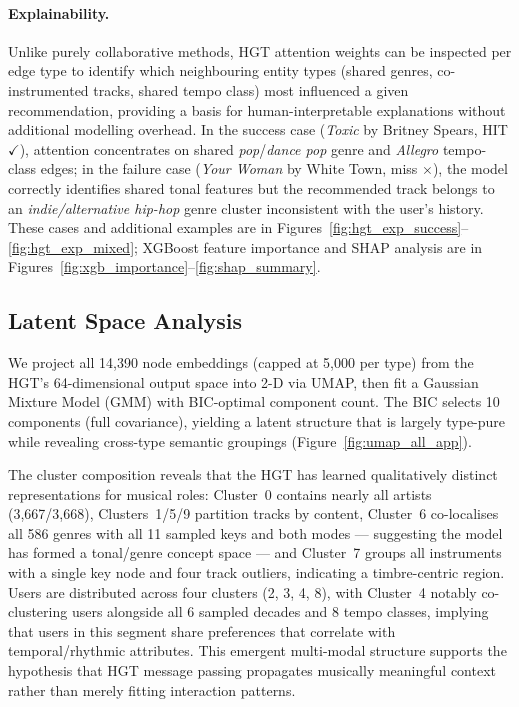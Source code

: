 \paragraph{Explainability.} Unlike purely collaborative methods, HGT attention weights can be inspected per edge type to identify which neighbouring entity types (shared genres, co-instrumented tracks, shared tempo class) most influenced a given recommendation, providing a basis for human-interpretable explanations without additional modelling overhead. In the success case (\textit{Toxic} by Britney Spears, HIT $\checkmark$), attention concentrates on shared \textit{pop}/\textit{dance pop} genre and \textit{Allegro} tempo-class edges; in the failure case (\textit{Your Woman} by White Town, miss $\times$), the model correctly identifies shared tonal features but the recommended track belongs to an \textit{indie/alternative hip-hop} genre cluster inconsistent with the user's history. These cases and additional examples are in Figures~\ref{fig:hgt_exp_success}--\ref{fig:hgt_exp_mixed}; XGBoost feature importance and SHAP analysis are in Figures~\ref{fig:xgb_importance}--\ref{fig:shap_summary}.

\subsection{Latent Space Analysis}
\label{sec:latent}

We project all 14,390 node embeddings (capped at 5,000 per type) from the HGT's 64-dimensional output space into 2-D via UMAP, then fit a Gaussian Mixture Model (GMM) with BIC-optimal component count. The BIC selects 10 components (full covariance), yielding a latent structure that is largely type-pure while revealing cross-type semantic groupings (Figure~\ref{fig:umap_all_app}).

The cluster composition reveals that the HGT has learned qualitatively distinct representations for musical roles: Cluster~0 contains nearly all artists (3,667/3,668), Clusters~1/5/9 partition tracks by content, Cluster~6 co-localises all 586 genres with all 11 sampled keys and both modes — suggesting the model has formed a tonal/genre concept space — and Cluster~7 groups all instruments with a single key node and four track outliers, indicating a timbre-centric region. Users are distributed across four clusters (2, 3, 4, 8), with Cluster~4 notably co-clustering users alongside all 6 sampled decades and 8 tempo classes, implying that users in this segment share preferences that correlate with temporal/rhythmic attributes. This emergent multi-modal structure supports the hypothesis that HGT message passing propagates musically meaningful context rather than merely fitting interaction patterns.
